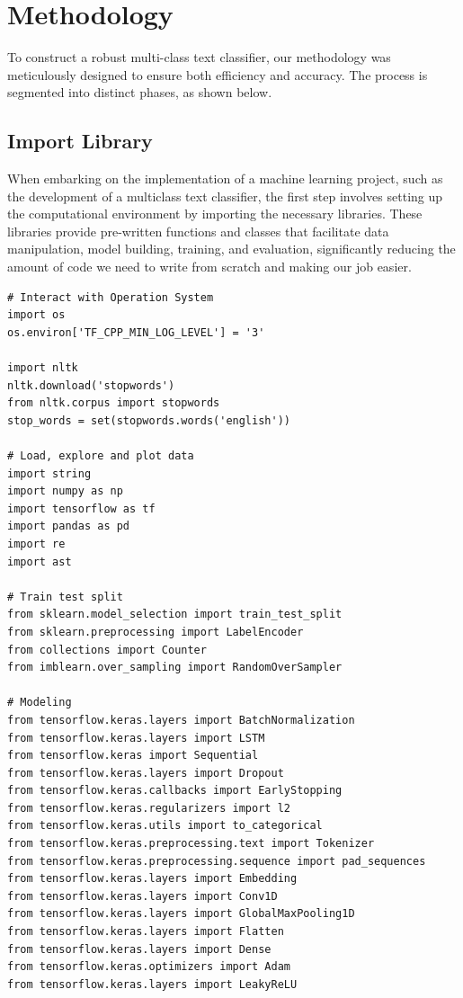 \section{Methodology}

To construct a robust multi-class text classifier, our methodology was meticulously designed to ensure both efficiency and accuracy. The process is segmented into distinct phases, as shown below.

\subsection{Import Library}
When embarking on the implementation of a machine learning project, such as the development of a multiclass text classifier, the first step involves setting up the computational environment by importing the necessary libraries. These libraries provide pre-written functions and classes that facilitate data manipulation, model building, training, and evaluation, significantly reducing the amount of code we need to write from scratch and making our job easier.

\begin{lstlisting}
# Interact with Operation System
import os
os.environ['TF_CPP_MIN_LOG_LEVEL'] = '3'

import nltk
nltk.download('stopwords')
from nltk.corpus import stopwords
stop_words = set(stopwords.words('english'))

# Load, explore and plot data
import string
import numpy as np
import tensorflow as tf
import pandas as pd
import re
import ast

# Train test split
from sklearn.model_selection import train_test_split
from sklearn.preprocessing import LabelEncoder
from collections import Counter
from imblearn.over_sampling import RandomOverSampler

# Modeling
from tensorflow.keras.layers import BatchNormalization
from tensorflow.keras.layers import LSTM
from tensorflow.keras import Sequential
from tensorflow.keras.layers import Dropout
from tensorflow.keras.callbacks import EarlyStopping
from tensorflow.keras.regularizers import l2
from tensorflow.keras.utils import to_categorical
from tensorflow.keras.preprocessing.text import Tokenizer
from tensorflow.keras.preprocessing.sequence import pad_sequences
from tensorflow.keras.layers import Embedding
from tensorflow.keras.layers import Conv1D
from tensorflow.keras.layers import GlobalMaxPooling1D
from tensorflow.keras.layers import Flatten
from tensorflow.keras.layers import Dense
from tensorflow.keras.optimizers import Adam
from tensorflow.keras.layers import LeakyReLU
\end{lstlisting}

